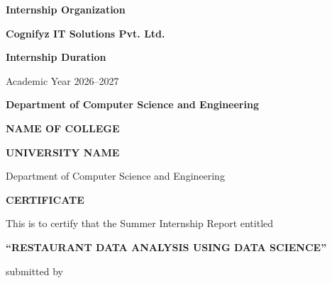 \documentclass[12pt,a4paper]{report}
\begin{document}
\begin{titlepage}
\begin{center}
\vspace{1cm}

{\large\bfseries Internship Organization}

\vspace{0.2cm}

{\large\bfseries Cognifyz IT Solutions Pvt. Ltd.}

\vspace{1cm}

{\large\bfseries Internship Duration}

\vspace{0.2cm}

{\color{ilbrown} Academic Year 2026--2027}

\vspace{1cm}

{\large\bfseries Department of Computer Science and Engineering}

\end{center}

\end{titlepage}


\clearpage
\thispagestyle{fancy}

\begin{center}

{\Large\bfseries NAME OF COLLEGE}

{\large\bfseries UNIVERSITY NAME}

\vspace{0.2cm}

{\large Department of Computer Science and Engineering}

\vspace{0.6cm}

{\Large\bfseries CERTIFICATE}

\end{center}

\vspace{0.4cm}

This is to certify that the Summer Internship Report entitled

\begin{center}
{\large\bfseries ``RESTAURANT DATA ANALYSIS USING DATA SCIENCE''}
\end{center}

submitted by
\end{document}
